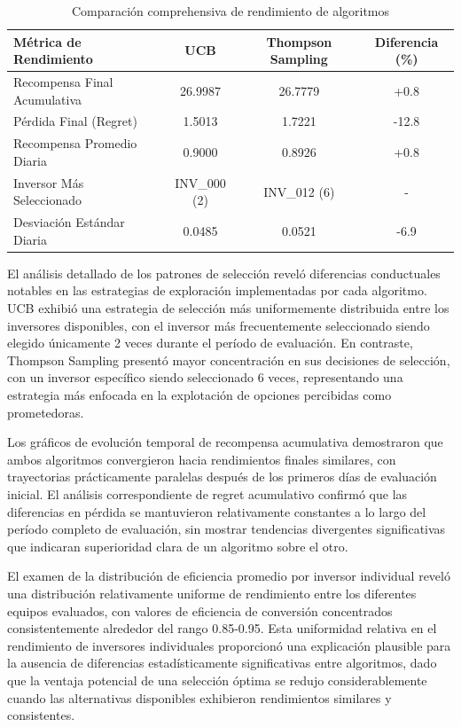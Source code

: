 \documentclass[12pt,a4paper]{article}
\begin{document}
\begin{table}[h!]
\centering
\caption{Comparación comprehensiva de rendimiento de algoritmos}
\label{tab:performance}
\begin{tabular}{@{}lccc@{}}
\toprule
\textbf{Métrica de Rendimiento} & \textbf{UCB} & \textbf{Thompson Sampling} & \textbf{Diferencia (\%)} \\
\midrule
Recompensa Final Acumulativa & 26.9987 & 26.7779 & +0.8 \\
Pérdida Final (Regret) & 1.5013 & 1.7221 & -12.8 \\
Recompensa Promedio Diaria & 0.9000 & 0.8926 & +0.8 \\
Inversor Más Seleccionado & INV\_000 (2) & INV\_012 (6) & - \\
Desviación Estándar Diaria & 0.0485 & 0.0521 & -6.9 \\
\bottomrule
\end{tabular}
\end{table}

El análisis detallado de los patrones de selección reveló diferencias conductuales notables en las estrategias de exploración implementadas por cada algoritmo. UCB exhibió una estrategia de selección más uniformemente distribuida entre los inversores disponibles, con el inversor más frecuentemente seleccionado siendo elegido únicamente 2 veces durante el período de evaluación. En contraste, Thompson Sampling presentó mayor concentración en sus decisiones de selección, con un inversor específico siendo seleccionado 6 veces, representando una estrategia más enfocada en la explotación de opciones percibidas como prometedoras.

Los gráficos de evolución temporal de recompensa acumulativa demostraron que ambos algoritmos convergieron hacia rendimientos finales similares, con trayectorias prácticamente paralelas después de los primeros días de evaluación inicial. El análisis correspondiente de regret acumulativo confirmó que las diferencias en pérdida se mantuvieron relativamente constantes a lo largo del período completo de evaluación, sin mostrar tendencias divergentes significativas que indicaran superioridad clara de un algoritmo sobre el otro.

El examen de la distribución de eficiencia promedio por inversor individual reveló una distribución relativamente uniforme de rendimiento entre los diferentes equipos evaluados, con valores de eficiencia de conversión concentrados consistentemente alrededor del rango 0.85-0.95. Esta uniformidad relativa en el rendimiento de inversores individuales proporcionó una explicación plausible para la ausencia de diferencias estadísticamente significativas entre algoritmos, dado que la ventaja potencial de una selección óptima se redujo considerablemente cuando las alternativas disponibles exhibieron rendimientos similares y consistentes.
\end{document}
